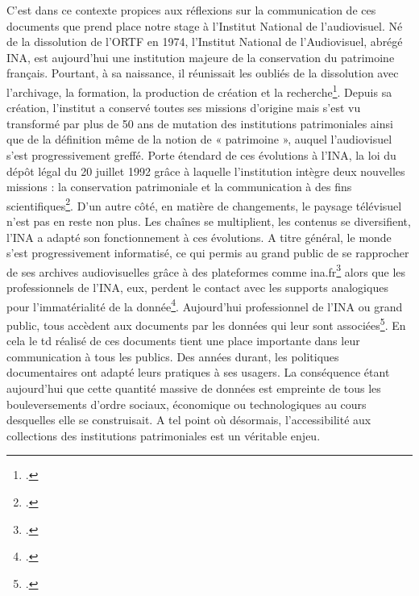 C'est dans ce contexte propices aux réflexions sur la communication de ces documents que prend place notre stage à l'Institut National de l'audiovisuel. Né de la dissolution de l’ORTF en 1974, l’Institut National de l’Audiovisuel, abrégé INA, est aujourd’hui une institution majeure de la conservation du patrimoine français. Pourtant, à sa naissance, il réunissait les oubliés de la dissolution avec l’archivage, la formation, la production de création et la recherche\footcite[][3]{hoog2006}. Depuis sa création, l’institut a conservé toutes ses missions d’origine mais s’est vu transformé par plus de 50 ans de mutation des institutions patrimoniales ainsi que de la définition même de la notion de « patrimoine », auquel l’audiovisuel s’est progressivement greffé. Porte étendard de ces évolutions à l’INA, la loi du dépôt légal du 20 juillet 1992 grâce à laquelle l’institution intègre deux nouvelles missions : la conservation patrimoniale et la communication à des fins scientifiques\footcite{fillioud1994}. D’un autre côté, en matière de changements, le paysage télévisuel n’est pas en reste non plus. Les chaînes se multiplient, les contenus se diversifient, l’INA a adapté son fonctionnement à ces évolutions. A titre général, le monde s’est progressivement informatisé, ce qui permis au grand public de se rapprocher de ses archives audiovisuelles grâce à des plateformes comme ina.fr\footcite{zotero-item-158} alors que les professionnels de l’INA, eux, perdent le contact avec les supports analogiques pour l’immatérialité de la donnée\footcite[][68]{bassaïstéguy2025}. Aujourd’hui professionnel de l’INA ou grand public, tous accèdent aux documents par les données qui leur sont associées\footcite[][118]{alquier2017}. En cela le \gls{td} réalisé de ces documents tient une place importante dans leur communication à tous les publics. Des années durant, les politiques documentaires ont adapté leurs pratiques à ses usagers. La conséquence étant aujourd'hui que cette quantité massive de données est empreinte de tous les bouleversements d'ordre sociaux, économique ou technologiques au cours desquelles elle se construisait. A tel point où désormais, l'accessibilité aux collections des institutions patrimoniales est un véritable enjeu. 


